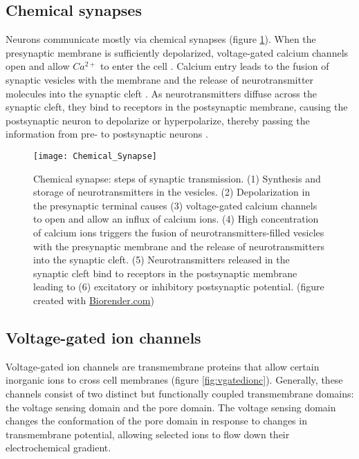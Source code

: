 

\subsection{Chemical synapses}
Neurons communicate mostly via chemical synapses (figure  \ref{fig:chemicalsynapse}). When the presynaptic membrane is sufficiently depolarized, voltage-gated calcium channels open and allow $Ca^{2+}$ to enter the cell \parencite{Luo2020}. Calcium entry leads to the fusion of synaptic vesicles with the membrane and the release of neurotransmitter molecules into the synaptic cleft \parencite{Chapman2002}.  As neurotransmitters diffuse across the synaptic cleft, they bind to receptors in the postsynaptic membrane, causing the postsynaptic neuron to depolarize or hyperpolarize, thereby passing the information from pre- to postsynaptic neurons \parencite{Maio2008}. 

\begin{figure}
\centering
\hspace*{-1cm} 
\texttt{[image: Chemical\_Synapse]}
\caption[Chemical synapse: steps of synaptic transmission] {Chemical synapse: steps of synaptic transmission. (1) Synthesis and storage of neurotransmitters in the vesicles. (2) Depolarization in the presynaptic terminal causes (3) voltage-gated calcium channels to open and allow an influx of calcium ions. (4) High concentration of calcium ions triggers the fusion of neurotransmitters-filled vesicles with the presynaptic membrane and the release of neurotransmitters into the synaptic cleft. (5) Neurotransmitters released in the synaptic cleft bind to receptors in the postsynaptic membrane leading to (6) excitatory or inhibitory postsynaptic potential. (figure created with \href{https://app.biorender.com/biorender-templates}{Biorender.com})}
\label{fig:chemicalsynapse}
\end{figure}

\subsection{Voltage-gated ion channels}
Voltage-gated ion channels are transmembrane proteins that allow certain inorganic ions to cross cell membranes (figure  \ref{fig:vgatedionc}). Generally, these channels consist of two distinct but functionally coupled transmembrane domains: the voltage sensing domain and the pore domain. The voltage sensing domain changes the conformation of the pore domain in response to changes in transmembrane potential, allowing selected ions to flow down their electrochemical gradient. 

